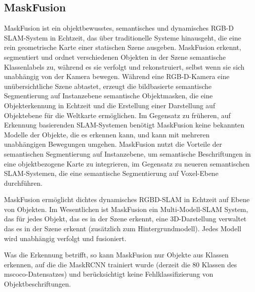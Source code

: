 \documentclass[a4paper, 11pt]{article}
\begin{document}
\begin{multicols*}{2}
    \subsection{MaskFusion}
    MaskFusion\cite{MaskFusion} ist ein objektbewusstes, semantisches und dynamisches RGB-D SLAM-System in Echtzeit, das über traditionelle Systeme hinausgeht, die eine rein geometrische Karte einer statischen Szene ausgeben. MaskFusion erkennt, segmentiert und ordnet verschiedenen Objekten in der Szene semantische Klassenlabels zu, während es sie verfolgt und rekonstruiert, selbst wenn sie sich unabhängig von der Kamera bewegen.
    Während eine RGB-D-Kamera eine unübersichtliche Szene abtastet, erzeugt die bildbasierte semantische Segmentierung auf Instanzebene semantische Objektmasken, die eine Objekterkennung in Echtzeit und die Erstellung einer Darstellung auf Objektebene für die Weltkarte ermöglichen. Im Gegensatz zu früheren, auf Erkennung basierenden SLAM-Systemen benötigt MaskFusion keine bekannten Modelle der Objekte, die es erkennen kann, und kann mit mehreren unabhängigen Bewegungen umgehen. MaskFusion nutzt die Vorteile der semantischen Segmentierung auf Instanzebene, um semantische Beschriftungen in eine objektbezogene Karte zu integrieren, im Gegensatz zu neueren semantischen SLAM-Systemen, die eine semantische Segmentierung auf Voxel-Ebene durchführen.

    MaskFusion ermöglicht dichtes dynamisches RGBD-SLAM in Echtzeit auf Ebene von Objekten. Im Wesentlichen ist MaskFusion ein Multi-Modell-SLAM System, das für jedes Objekt, das es in der Szene erkennt, eine 3D-Darstellung verwaltet das es in der Szene erkennt (zusätzlich zum Hintergrundmodell). Jedes Modell wird unabhängig verfolgt und fusioniert.

    Was die Erkennung betrifft, so kann MaskFusion nur Objekte aus Klassen erkennen, auf die die MaskRCNN trainiert wurde (derzeit die 80 Klassen des \Gls{mscoco}-Datensatzes) und berücksichtigt keine Fehlklassifizierung von Objektbeschriftungen.


\end{multicols*}
\end{document}
